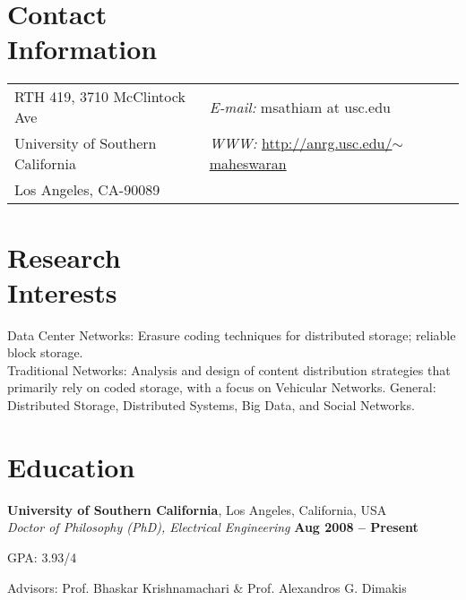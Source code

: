 \documentclass[margin,line]{resume}
\begin{document}
\begin{resume}


\section{\mysidestyle Contact\\Information}


\begin{tabular}{@{}p{3in}p{6in}}
RTH 419, 3710 McClintock Ave &  {\it E-mail:}  msathiam at usc.edu\\
University of Southern California & {\it WWW:} \href{http://anrg.usc.edu/~maheswaran}{http://anrg.usc.edu/$\sim$maheswaran} \\
Los Angeles, CA-90089 &      \\
\end{tabular}

    \section{\mysidestyle Research\\Interests}
	Data Center Networks: Erasure coding techniques for distributed storage; reliable block storage. \\
	Traditional Networks: Analysis and design of content distribution strategies that primarily rely on coded storage, with a focus on Vehicular Networks.
	General: Distributed Storage, Distributed Systems, Big Data, and Social Networks.
    \section{\mysidestyle Education}

    \textbf{University of Southern California}, Los Angeles, California, USA \\%
    \textsl{Doctor of Philosophy (PhD), Electrical Engineering} \hfill \textbf{ Aug 2008 -- Present}\vspace{-3mm}\\\vspace{-1mm}
    \begin{list2}
        \item GPA: 3.93/4
        \item Advisors:  Prof. Bhaskar Krishnamachari \& Prof. Alexandros G. Dimakis
    \end{list2}\vspace{-1.5mm}
    

\end{resume}
\end{document}
